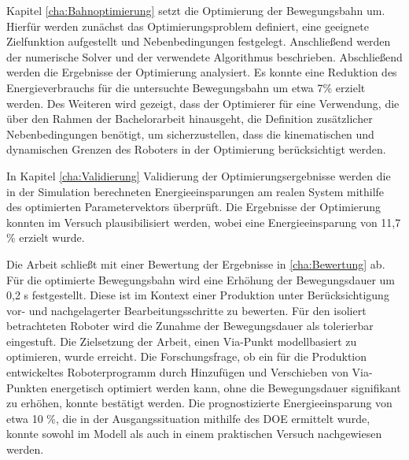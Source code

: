 Kapitel \ref{cha:Bahnoptimierung} setzt die Optimierung der Bewegungsbahn um. Hierfür werden zunächst das Optimierungsproblem definiert, eine geeignete Zielfunktion aufgestellt und Nebenbedingungen festgelegt. Anschließend werden der numerische Solver und der verwendete Algorithmus beschrieben. Abschließend werden die Ergebnisse der Optimierung analysiert. Es konnte eine Reduktion des Energieverbrauchs für die untersuchte Bewegungsbahn um etwa 7\% erzielt werden. Des Weiteren wird gezeigt, dass der Optimierer für eine Verwendung, die über den Rahmen der Bachelorarbeit hinausgeht, die Definition zusätzlicher Nebenbedingungen benötigt, um sicherzustellen, dass die kinematischen und dynamischen Grenzen des Roboters in der Optimierung berücksichtigt werden.

In Kapitel \ref{cha:Validierung} Validierung der Optimierungsergebnisse werden die in der Simulation berechneten Energieeinsparungen am realen System mithilfe des optimierten Parametervektors überprüft. Die Ergebnisse der Optimierung konnten im Versuch plausibilisiert werden, wobei eine Energieeinsparung von 11,7 \% erzielt wurde.

Die Arbeit schließt mit einer Bewertung der Ergebnisse in \ref{cha:Bewertung} ab. Für die optimierte Bewegungsbahn wird eine Erhöhung der Bewegungsdauer um 0,2 s festgestellt. Diese ist im Kontext einer Produktion unter Berücksichtigung vor- und nachgelagerter Bearbeitungsschritte zu bewerten. Für den isoliert betrachteten Roboter wird die Zunahme der Bewegungsdauer als tolerierbar eingestuft. Die Zielsetzung der Arbeit, einen Via-Punkt modellbasiert zu optimieren, wurde erreicht. Die Forschungsfrage, ob ein für die Produktion entwickeltes Roboterprogramm durch Hinzufügen und Verschieben von Via-Punkten energetisch optimiert werden kann, ohne die Bewegungsdauer signifikant zu erhöhen, konnte bestätigt werden. Die prognostizierte Energieeinsparung von etwa 10 \%, die in der Ausgangssituation mithilfe des DOE ermittelt wurde, konnte sowohl im Modell als auch in einem praktischen Versuch nachgewiesen werden.

